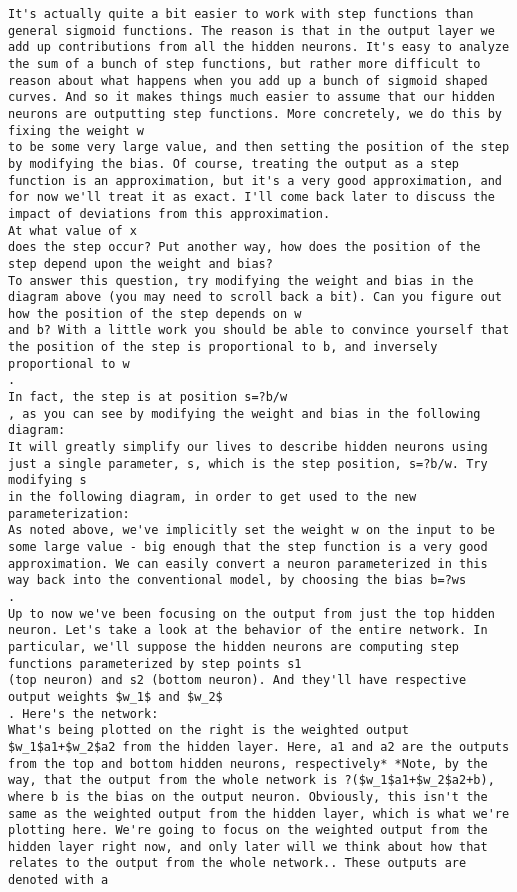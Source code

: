 \begin{lstlisting}
It's actually quite a bit easier to work with step functions than general sigmoid functions. The reason is that in the output layer we add up contributions from all the hidden neurons. It's easy to analyze the sum of a bunch of step functions, but rather more difficult to reason about what happens when you add up a bunch of sigmoid shaped curves. And so it makes things much easier to assume that our hidden neurons are outputting step functions. More concretely, we do this by fixing the weight w
to be some very large value, and then setting the position of the step by modifying the bias. Of course, treating the output as a step function is an approximation, but it's a very good approximation, and for now we'll treat it as exact. I'll come back later to discuss the impact of deviations from this approximation.
At what value of x
does the step occur? Put another way, how does the position of the step depend upon the weight and bias?
To answer this question, try modifying the weight and bias in the diagram above (you may need to scroll back a bit). Can you figure out how the position of the step depends on w
and b? With a little work you should be able to convince yourself that the position of the step is proportional to b, and inversely proportional to w
.
In fact, the step is at position s=?b/w
, as you can see by modifying the weight and bias in the following diagram:
It will greatly simplify our lives to describe hidden neurons using just a single parameter, s, which is the step position, s=?b/w. Try modifying s
in the following diagram, in order to get used to the new parameterization:
As noted above, we've implicitly set the weight w on the input to be some large value - big enough that the step function is a very good approximation. We can easily convert a neuron parameterized in this way back into the conventional model, by choosing the bias b=?ws
.
Up to now we've been focusing on the output from just the top hidden neuron. Let's take a look at the behavior of the entire network. In particular, we'll suppose the hidden neurons are computing step functions parameterized by step points s1
(top neuron) and s2 (bottom neuron). And they'll have respective output weights $w_1$ and $w_2$
. Here's the network:
What's being plotted on the right is the weighted output $w_1$a1+$w_2$a2 from the hidden layer. Here, a1 and a2 are the outputs from the top and bottom hidden neurons, respectively* *Note, by the way, that the output from the whole network is ?($w_1$a1+$w_2$a2+b), where b is the bias on the output neuron. Obviously, this isn't the same as the weighted output from the hidden layer, which is what we're plotting here. We're going to focus on the weighted output from the hidden layer right now, and only later will we think about how that relates to the output from the whole network.. These outputs are denoted with a

\end{lstlisting}
